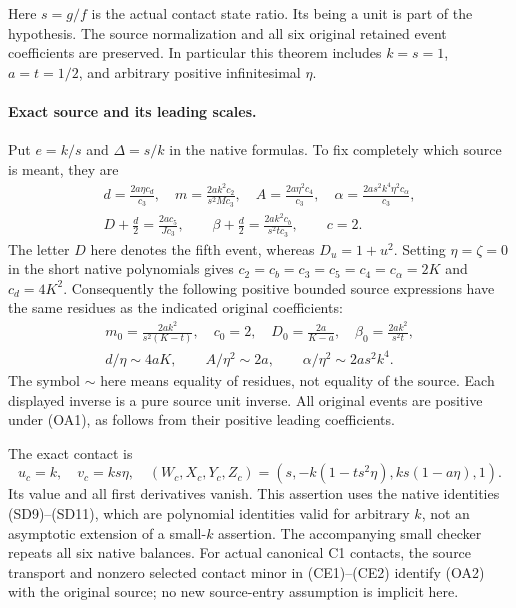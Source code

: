 Here $s=g/f$ is the actual contact state ratio. Its being a unit is
part of the hypothesis. The source normalization and all six original
retained event coefficients are preserved. In particular this theorem
includes $k=s=1$, $a=t=1/2$, and arbitrary positive infinitesimal $\eta$.

\paragraph{Exact source and its leading scales.}
Put $e=k/s$ and $\Delta=s/k$ in the native formulas. To fix completely
which source is meant, they are
\[
\begin{gathered}
 d=\frac{2a\eta c_d}{c_3},\quad
 m=\frac{2ak^2c_2}{s^2Mc_3},\quad
 A=\frac{2a\eta^2c_4}{c_3},\quad
 \alpha=\frac{2as^2k^4\eta^2c_\alpha}{c_3},\\
 D+\frac d2=\frac{2ac_5}{Jc_3},\qquad
 \beta+\frac d2=\frac{2ak^2c_b}{s^2tc_3},\qquad c=2.
\end{gathered}
\tag{OA2}
\]
The letter $D$ here denotes the fifth event, whereas $D_u=1+u^2$.
Setting $\eta=\zeta=0$ in the short native polynomials gives
$c_2=c_b=c_3=c_5=c_4=c_\alpha=2K$ and $c_d=4K^2$.
Consequently the following positive bounded source expressions have
the same residues as the indicated original coefficients:
\[
\begin{gathered}
 m_0=\frac{2ak^2}{s^2(K-t)},\quad
 c_0=2,\quad D_0=\frac{2a}{K-a},\quad
 \beta_0=\frac{2ak^2}{s^2t},\\
 d/\eta\sim4aK,\qquad A/\eta^2\sim2a,\qquad
 \alpha/\eta^2\sim2as^2k^4.                         
\end{gathered}
\tag{OA3}
\]
The symbol $\sim$ here means equality of residues, not equality of
the source. Each displayed inverse is a pure source unit inverse.
All original events are positive under (OA1), as follows from their
positive leading coefficients.

The exact contact is
\[
 u_c=k,\quad v_c=ks\eta,\quad
 (W_c,X_c,Y_c,Z_c)=(s,-k(1-ts^2\eta),ks(1-a\eta),1).
                                                        \tag{OA4}
\]
Its value and all first derivatives vanish. This assertion uses the
native identities (SD9)--(SD11), which are polynomial identities valid
for arbitrary $k$, not an asymptotic extension of a small-$k$ assertion.
The accompanying small checker repeats all six native balances.
For actual canonical C1 contacts, the source transport and nonzero
selected contact minor in (CE1)--(CE2) identify (OA2) with the original
source; no new source-entry assumption is implicit here.

